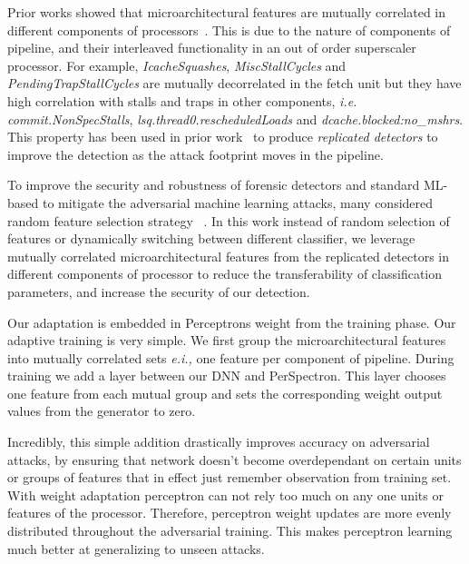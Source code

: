 Prior works showed that microarchitectural features are mutually correlated in different components of processors~\cite{PerSpectron}. This is due to the nature of components of pipeline, and their interleaved functionality in an out of order superscaler processor. For example, \textit{IcacheSquashes}, \textit{MiscStallCycles} and \textit{PendingTrapStallCycles} 
are mutually decorrelated in the fetch unit but they have high correlation with stalls 
and traps in other components, {\em i.e.} \textit{commit.NonSpecStalls}, 
\textit{lsq.thread0.rescheduledLoads} and \textit{dcache.blocked:no\_mshrs}. This property has been used in prior work~\cite{PerSpectron} to produce {\em replicated detectors} to improve the detection as the attack footprint moves in the pipeline.



To improve the security and robustness of forensic detectors and
standard ML-based to mitigate the adversarial machine learning attacks, 
many considered random feature selection
strategy
~\cite{nowroozi2020survey, secureDetection2019}.
 In this work instead of random selection of features or  dynamically switching between different classifier, we leverage  mutually correlated microarchitectural features from the replicated detectors in different components of processor to reduce the transferability of classification parameters, and increase the security of our 
detection. 

Our adaptation is embedded in Perceptrons weight from the training phase.  Our adaptive training is very simple. We first group the microarchitectural features into mutually correlated sets {\em e.i.,} one feature per component of pipeline. During training we add a layer between our DNN and PerSpectron. This layer chooses one feature from each mutual group and sets the corresponding weight output values from the  generator to zero.

Incredibly, this simple addition drastically improves accuracy on adversarial attacks, by ensuring that network doesn't become overdependant on certain units or groups of features that in effect just remember observation from training set. With weight adaptation perceptron can not rely too much on any one units or features of the processor. Therefore, perceptron weight updates are more evenly distributed throughout the adversarial training. This makes perceptron learning much better at generalizing to unseen attacks. 

